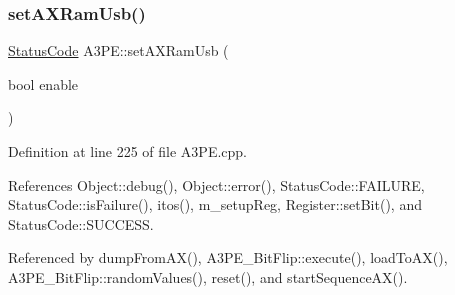 \subsubsection{\texorpdfstring{set\+A\+X\+Ram\+Usb()}{setAXRamUsb()}}
{\footnotesize\ttfamily \hyperlink{classStatusCode}{Status\+Code} A3\+P\+E\+::set\+A\+X\+Ram\+Usb (\begin{DoxyParamCaption}\item[{bool}]{enable }\end{DoxyParamCaption})}



Definition at line 225 of file A3\+P\+E.\+cpp.



References Object\+::debug(), Object\+::error(), Status\+Code\+::\+F\+A\+I\+L\+U\+RE, Status\+Code\+::is\+Failure(), itos(), m\+\_\+setup\+Reg, Register\+::set\+Bit(), and Status\+Code\+::\+S\+U\+C\+C\+E\+SS.



Referenced by dump\+From\+A\+X(), A3\+P\+E\+\_\+\+Bit\+Flip\+::execute(), load\+To\+A\+X(), A3\+P\+E\+\_\+\+Bit\+Flip\+::random\+Values(), reset(), and start\+Sequence\+A\+X().


